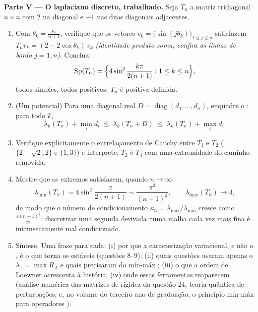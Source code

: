 \begin{problem}
\medskip
\noindent\textbf{Parte V --- O laplaciano discreto, trabalhado.}
Seja $T_n$ a matriz tridiagonal $n \times n$ com $2$ na
diagonal e $-1$ nas duas diagonais adjacentes.
\begin{enumerate}[resume]
  \item Com $\theta_k = \frac{k\pi}{n+1}$, verifique que os
        vetores $v_k = \bigl(\sin(j\theta_k)\bigr)_{1\leq j\leq
        n}$ satisfazem $T_nv_k = (2 - 2\cos\theta_k)\,v_k$
        \emph{(identidade produto-soma; confira as linhas de bordo
        $j = 1, n$)}. Conclua:
        \[
        \operatorname{Sp}(T_n) = \Bigl\{4\sin^2
        \frac{k\pi}{2(n+1)} : 1 \leq k \leq n\Bigr\},
        \]
        todos simples, todos positivos: $T_n$ é positiva definida.
  \item (Um potencial) Para uma diagonal real $D =
        \operatorname{diag}(d_1, \dots, d_n)$, enquadre o
        : para todo $k$,
        \[
        \lambda_k(T_n) + \min_i d_i \;\leq\;
        \lambda_k(T_n + D) \;\leq\; \lambda_k(T_n) + \max_i
        d_i .
        \]
  \item Verifique explicitamente o entrelaçamento de Cauchy entre $T_3$ e $T_2$
        ( $\{2 \pm \sqrt2, 2\}$ e $\{1,
        3\}$) e interprete: $T_2$ é $T_3$ com uma extremidade
        do caminho removida.
  \item Mostre que os  extremos satisfazem, quando $n \to
        \infty$:
        \[
        \lambda_{\min}(T_n) = 4\sin^2\frac{\pi}{2(n+1)}
        \sim \frac{\pi^2}{(n+1)^2},
        \qquad
        \lambda_{\max}(T_n) \to 4 ,
        \]
        de modo que o número de condicionamento $\kappa_n =
        \lambda_{\max}/\lambda_{\min}$ cresce como
        $\frac{4(n+1)^2}{\pi^2}$: discretizar uma segunda
        derivada numa malha cada vez mais fina é
        intrinsecamente mal condicionado.
  \item Síntese. Uma frase para cada: (i) por que a
        caracterização variacional, e não o , é o que torna os  estáveis
        (questões 8--9); (ii) quais questões usaram apenas
        o $\lambda_1 = \max R_A$ e quais precisaram do
        mín-máx ; (iii) o que a ordem de Loewner acrescenta à
        história; (iv) onde essas ferramentas reaparecem (análise
        numérica das matrizes de rigidez da questão 24; teoria
        quântica de perturbações; e, no volume do terceiro ano de graduação, o
        princípio mín-máx para operadores 
        ).
\end{enumerate}
\end{problem}
